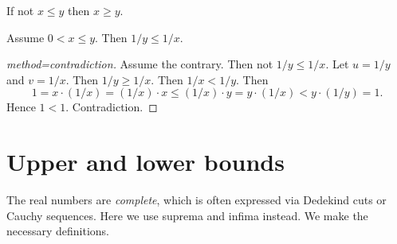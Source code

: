 \documentclass{article}
\begin{document}
\begin{forthel}
\begin{lemma}[title=syz]
If not $x \leq y$ then $x \geq y$.
\end{lemma}

\begin{proposition}
Assume $0 < x \leq y$.
Then $1/y \leq 1/x$.
\end{proposition}
\begin{proof}[method=contradiction]
Assume the contrary.
Then not $1/y \leq 1/x$. Let $u = 1/y$ and $v = 1/x$.
Then $1/y \geq 1/x$.
Then $1/x < 1/y$.
Then
\[ 1 = x \cdot (1/x) = (1/x) \cdot x \leq (1/x) \cdot y =
y \cdot (1/x) < y \cdot (1/y) = 1. \]
Hence $1 < 1$. Contradiction.
\end{proof}

\end{forthel}


\section{Upper and lower bounds}

The real numbers are {\em complete}, which is often expressed
via Dedekind cuts or Cauchy sequences. Here
we use suprema and infima instead. We make the
necessary definitions.
\end{document}
